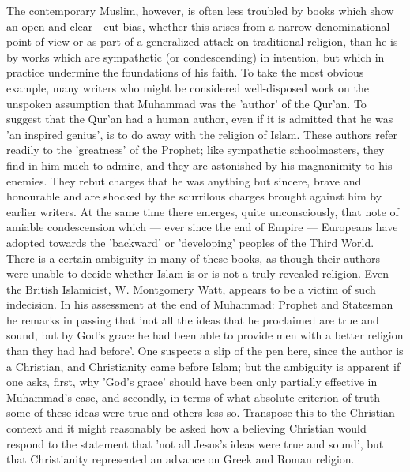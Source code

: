 \documentclass[11pt, b5paper, twoside]{book}
\begin{document}
The contemporary Muslim, however, is often less troubled by books which show an open and clear---cut bias, whether this arises from a narrow denominational point of view or as part of a generalized attack on traditional religion, than he is by works which are sympathetic (or condescending) in intention, but which in practice undermine the foundations of his faith. To take the most obvious example, many writers who might be considered well-disposed work on the unspoken assumption that Muhammad was the 'author' of the Qur'an. To suggest that the Qur'an had a human author, even if it is admitted that he was 'an inspired genius', is to do away with the religion of Islam. These authors refer readily to the 'greatness' of the Prophet; like sympathetic schoolmasters, they find in him much to admire, and they are astonished by his magnanimity to his enemies. They rebut charges that he was anything but sincere, brave and honourable and are shocked by the scurrilous charges brought against him by earlier writers. At the same time there emerges, quite unconsciously, that note of amiable condescension which --- ever since the end of Empire --- Europeans have adopted towards the 'backward' or 'developing' peoples of the Third World. \\

There is a certain ambiguity in many of these books, as though their authors were unable to decide whether Islam is or is not a truly revealed religion. Even the British Islamicist, W. Montgomery Watt, appears to be a victim of such indecision. In his assessment at the end of Muhammad: Prophet and Statesman he remarks in passing that 'not all the ideas that he proclaimed are true and sound, but by God's grace he had been able to provide men with a better religion than they had had before'. One suspects a slip of the pen here, since the author is a Christian, and Christianity came before Islam; but the ambiguity is apparent if one asks, first, why 'God's grace' should have been only partially effective in Muhammad's case, and secondly, in terms of what absolute criterion of truth some of these ideas were true and others less so. Transpose this to the Christian context and it might reasonably be asked how a believing Christian would respond to the statement that 'not all Jesus's ideas were true and sound', but that Christianity represented an advance on Greek and Roman religion. \\
\end{document}
